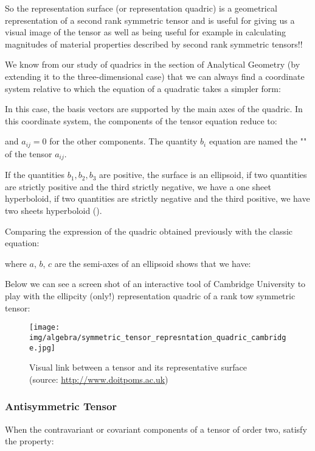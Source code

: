 	So the representation surface (or representation quadric) is a geometrical representation of a second rank symmetric tensor and is useful for giving us a visual image of the tensor as well as being useful for example in calculating magnitudes of material properties described by second rank symmetric tensors!!
	
	We know from our study of quadrics in the section of Analytical Geometry (by extending it to the three-dimensional case) that we can always find a coordinate system relative to which the equation of a quadratic takes a simpler form:
	
	In this case, the basis vectors are supported by the main axes of the quadric. In this coordinate system, the components of the tensor equation reduce to:
	
	and $a_{ij}=0$ for the other components. The quantity $b_i$ equation are named the "" of the tensor $a_{ij}$.

	If the quantities $b_1,b_2,b_3$ are positive, the surface is an ellipsoid, if two quantities are strictly positive and the third strictly negative, we have a one sheet hyperboloid, if two quantities are strictly negative and the third positive, we have two sheets hyperboloid ().
	
	Comparing the expression of the quadric obtained previously with the classic equation:
	
	where $a$, $b$, $c$ are the semi-axes of an ellipsoid shows that we have:
	
	Below we can see a screen shot of an interactive tool of Cambridge University to play with the ellipcity (only!) representation quadric of a rank tow symmetric tensor:
	\begin{figure}[H]
		\centering
		\texttt{[image: img/algebra/symmetric\_tensor\_represntation\_quadric\_cambridge.jpg]}
		\caption[Visual link between a tensor and its representative surface]{Visual link between a tensor and its representative surface \\(source: \href{http://www.doitpoms.ac.uk/tlplib/tensors/representation.php}{http://www.doitpoms.ac.uk})}
	\end{figure}
	
	\subsubsection{Antisymmetric Tensor}
	When the contravariant or covariant components of a tensor of order two, satisfy the property:
	
